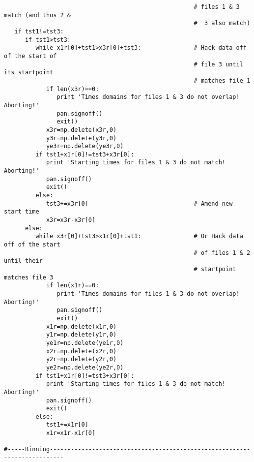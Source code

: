 \begin{verbatim}
                                                      # files 1 & 3 match (and thus 2 &
                                                      #  3 also match)
   if tst1!=tst3:
      if tst1>tst3:
         while x1r[0]+tst1>x3r[0]+tst3:               # Hack data off of the start of
                                                      # file 3 until its startpoint
                                                      # matches file 1
            if len(x3r)==0:
               print 'Times domains for files 1 & 3 do not overlap!  Aborting!'
               pan.signoff()
               exit()
            x3r=np.delete(x3r,0)
            y3r=np.delete(y3r,0)
            ye3r=np.delete(ye3r,0)
         if tst1+x1r[0]!=tst3+x3r[0]:
            print 'Starting times for files 1 & 3 do not match!  Aborting!'
            pan.signoff()
            exit()
         else:
            tst3+=x3r[0]                              # Amend new start time
            x3r=x3r-x3r[0]
      else:
         while x3r[0]+tst3>x1r[0]+tst1:               # Or Hack data off of the start
                                                      # of files 1 & 2 until their
                                                      # startpoint matches file 3
            if len(x1r)==0:
               print 'Times domains for files 1 & 3 do not overlap!  Aborting!'
               pan.signoff()
               exit()
            x1r=np.delete(x1r,0)
            y1r=np.delete(y1r,0)
            ye1r=np.delete(ye1r,0)
            x2r=np.delete(x2r,0)
            y2r=np.delete(y2r,0)
            ye2r=np.delete(ye2r,0)
         if tst1+x1r[0]!=tst3+x3r[0]:
            print 'Starting times for files 1 & 3 do not match!  Aborting!'
            pan.signoff()
            exit()
         else:
            tst1+=x1r[0]
            x1r=x1r-x1r[0]

#-----Binning--------------------------------------------------------------------------


\end{verbatim}

